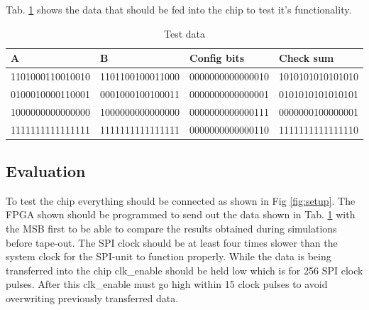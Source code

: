 Tab. \ref{tab:test_data} shows the data that should be fed into the chip to test it's functionality.

\begin{table}[H]
  \caption{Test data}
  \centering
  \begin{tabularx}{\linewidth}{|X|X|X|X|}
    \hline
    \textbf{A} & \textbf{B} & \textbf{Config bits} & \textbf{Check sum} \\ \hline
    1101000110010010 & 1101100100011000 & 0000000000000010 & 1010101010101010\\ \hline
    0100010000110001 & 0001000100100011 & 0000000000000001 & 0101010101010101\\ \hline
    1000000000000000 & 1000000000000000 & 0000000000000111 & 0000000100000001\\ \hline
    1111111111111111 & 1111111111111111 & 0000000000000110 & 1111111111111110\\ \hline
  \end{tabularx}
  \label{tab:test_data}
\end{table}   

\subsection{Evaluation}
To test the chip everything should be connected as shown in Fig \ref{fig:setup}. The FPGA shown should be programmed to send out the data shown in Tab. \ref{tab:test_data} with the MSB first to be able to compare the results obtained during simulations before tape-out. The SPI clock should be at least four times slower than the system clock for the SPI-unit to function properly. While the data is being transferred into the chip clk\_enable should be held low which is for 256 SPI clock pulses. After this clk\_enable must go high within 15 clock pulses to avoid overwriting previously transferred data.

